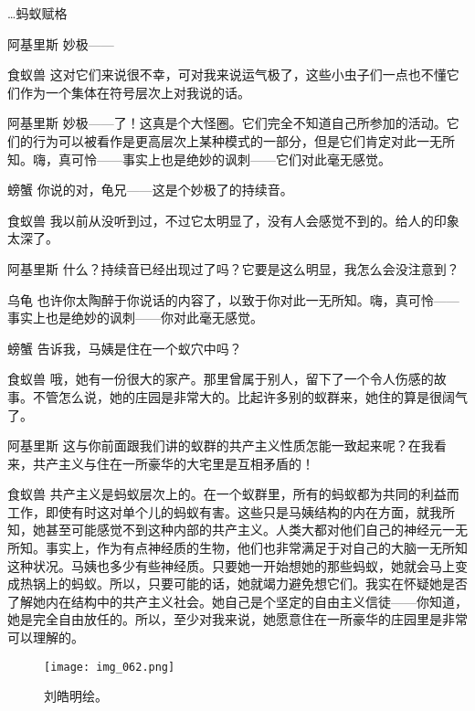\begin{dialog}{…蚂蚁赋格}
\begin{dialogue}
\item[阿基里斯]妙极——

\item[食蚁兽]这对它们来说很不幸，可对我来说运气极了，这些小虫子们一点也不懂它们作为一个集体在符号层次上对我说的话。

\item[阿基里斯]妙极——了！这真是个大怪圈。它们完全不知道自己所参加的活动。它们的行为可以被看作是更高层次上某种模式的一部分，但是它们肯定对此一无所知。嗨，真可怜——事实上也是绝妙的讽刺——它们对此毫无感觉。

\item[螃蟹]你说的对，龟兄——这是个妙极了的持续音。

\item[食蚁兽]我以前从没听到过，不过它太明显了，没有人会感觉不到的。给人的印象太深了。

\item[阿基里斯]什么？持续音已经出现过了吗？它要是这么明显，我怎么会没注意到？

\item[乌龟]也许你太陶醉于你说话的内容了，以致于你对此一无所知。嗨，真可怜——事实上也是绝妙的讽刺——你对此毫无感觉。

\item[螃蟹]告诉我，马姨是住在一个蚁穴中吗？

\item[食蚁兽]哦，她有一份很大的家产。那里曾属于别人，留下了一个令人伤感的故事。不管怎么说，她的庄园是非常大的。比起许多别的蚁群来，她住的算是很阔气了。

\item[阿基里斯]这与你前面跟我们讲的蚁群的共产主义性质怎能一致起来呢？在我看来，共产主义与住在一所豪华的大宅里是互相矛盾的！

\item[食蚁兽]共产主义是蚂蚁层次上的。在一个蚁群里，所有的蚂蚁都为共同的利益而工作，即使有时这对单个儿的蚂蚁有害。这些只是马姨结构的内在方面，就我所知，她甚至可能感觉不到这种内部的共产主义。人类大都对他们自己的神经元一无所知。事实上，作为有点神经质的生物，他们也非常满足于对自己的大脑一无所知这种状况。马姨也多少有些神经质。只要她一开始想她的那些蚂蚁，她就会马上变成热锅上的蚂蚁。所以，只要可能的话，她就竭力避免想它们。我实在怀疑她是否了解她内在结构中的共产主义社会。她自己是个坚定的自由主义信徒——你知道，她是完全自由放任的。所以，至少对我来说，她愿意住在一所豪华的庄园里是非常可以理解的。

\begin{figure}
\texttt{[image: img\_062.png]}
\caption[两个伟大名字的“交织”。]
  {刘皓明绘。}
\end{figure}


\end{dialogue}
\end{dialog}
